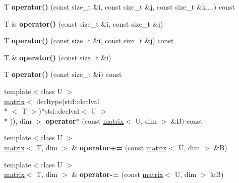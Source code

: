 \begin{DoxyCompactItemize}
\item 
\hypertarget{classkeycpp_1_1matrix_a64eab0f7e909d7858679338a52530ba9}{T {\bfseries operator()} (const size\-\_\-t \&i, const size\-\_\-t \&j, const size\-\_\-t \&k,...) const }\label{classkeycpp_1_1matrix_a64eab0f7e909d7858679338a52530ba9}

\item 
\hypertarget{classkeycpp_1_1matrix_ab3ac80a8839ee1367ed5d6dc2a4f10a1}{T \& {\bfseries operator()} (const size\-\_\-t \&i, const size\-\_\-t \&j)}\label{classkeycpp_1_1matrix_ab3ac80a8839ee1367ed5d6dc2a4f10a1}

\item 
\hypertarget{classkeycpp_1_1matrix_a09dd98285ca087613b94dceaf2cdd04d}{T {\bfseries operator()} (const size\-\_\-t \&i, const size\-\_\-t \&j) const }\label{classkeycpp_1_1matrix_a09dd98285ca087613b94dceaf2cdd04d}

\item 
\hypertarget{classkeycpp_1_1matrix_af19189228f639be9356bf782d546cfbd}{T \& {\bfseries operator()} (const size\-\_\-t \&i)}\label{classkeycpp_1_1matrix_af19189228f639be9356bf782d546cfbd}

\item 
\hypertarget{classkeycpp_1_1matrix_ae20c2af1bdff8d29a66a96736794d0ce}{T {\bfseries operator()} (const size\-\_\-t \&i) const }\label{classkeycpp_1_1matrix_ae20c2af1bdff8d29a66a96736794d0ce}

\item 
\hypertarget{classkeycpp_1_1matrix_a68bc6b14efbf17e118cdc50f6acaa34e}{{\footnotesize template$<$class U $>$ }\\\hyperlink{classkeycpp_1_1matrix}{matrix}$<$ decltype(std\-::declval\\*
$<$ T $>$)$\ast$std\-::declval$<$ U $>$\\*
)), dim $>$ {\bfseries operator$\ast$} (const \hyperlink{classkeycpp_1_1matrix}{matrix}$<$ U, dim $>$ \&B) const }\label{classkeycpp_1_1matrix_a68bc6b14efbf17e118cdc50f6acaa34e}

\item 
\hypertarget{classkeycpp_1_1matrix_a6a3e220b41546c3c4b5e5845c7afe9b7}{{\footnotesize template$<$class U $>$ }\\\hyperlink{classkeycpp_1_1matrix}{matrix}$<$ T, dim $>$ \& {\bfseries operator+=} (const \hyperlink{classkeycpp_1_1matrix}{matrix}$<$ U, dim $>$ \&B)}\label{classkeycpp_1_1matrix_a6a3e220b41546c3c4b5e5845c7afe9b7}

\item 
\hypertarget{classkeycpp_1_1matrix_a93827ea9fce509328ecb21731b31aab3}{{\footnotesize template$<$class U $>$ }\\\hyperlink{classkeycpp_1_1matrix}{matrix}$<$ T, dim $>$ \& {\bfseries operator-\/=} (const \hyperlink{classkeycpp_1_1matrix}{matrix}$<$ U, dim $>$ \&B)}\label{classkeycpp_1_1matrix_a93827ea9fce509328ecb21731b31aab3}


\end{DoxyCompactItemize}
